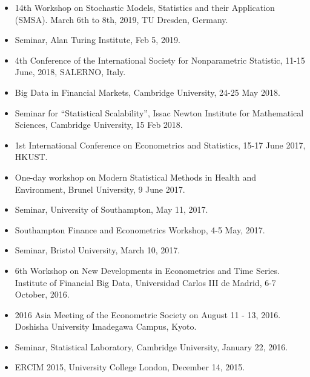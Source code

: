 \documentclass[overlapped,line,letterpaper]{res}
\begin{document}
\begin{resume}
\begin{itemize}
\item[$\bullet$] 14th Workshop on Stochastic Models, Statistics and their Application (SMSA). March 6th to 8th, 2019, TU Dresden, Germany.

\item[$\bullet$] Seminar, Alan Turing Institute, Feb 5, 2019.

\item[$\bullet$] 4th Conference of the International Society for Nonparametric Statistic, 11-15 June, 2018, SALERNO, Italy.

\item[$\bullet$] Big Data in Financial Markets, Cambridge University, 24-25 May 2018.

\item[$\bullet$] Seminar for ``Statistical Scalability'', Issac Newton Institute for Mathematical Sciences, Cambridge University, 15 Feb 2018.

\item[$\bullet$] 1st International Conference on Econometrics and Statistics, 15-17 June 2017, HKUST.
\item[$\bullet$] One-day workshop on Modern Statistical Methods in Health and Environment, Brunel University, 9 June 2017.

\item[$\bullet$] Seminar, University of Southampton, May 11, 2017.

\item[$\bullet$] Southampton Finance and Econometrics Workshop, 4-5 May, 2017.

\item[$\bullet$] Seminar, Bristol University, March 10, 2017.

\item[$\bullet$]  6th Workshop on New Developments in Econometrics and Time Series. Institute of Financial Big Data, Universidad Carlos III de Madrid, 6-7 October, 2016.

\item[$\bullet$] 2016 Asia Meeting of the Econometric Society on August 11 - 13, 2016. Doshisha University Imadegawa Campus, Kyoto.

\item[$\bullet$] Seminar, Statistical Laboratory, Cambridge University, January 22, 2016.

\item[$\bullet$] ERCIM 2015, University College London, December 14, 2015.



\end{itemize}
\end{resume}
\end{document}
